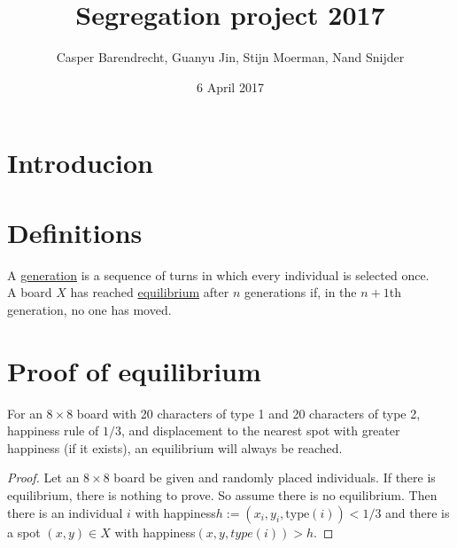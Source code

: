 \documentclass{article}
\title{Segregation project 2017}
\author{Casper Barendrecht, Guanyu Jin, Stijn Moerman, Nand Snijder}
\date{6 April 2017}
\begin{document}
\reversemarginpar 
\maketitle
\section{Introducion}

\section{Definitions}
A \underline{generation} is a sequence of turns in which every individual is selected once.\\
A board $X$ has reached \underline{equilibrium} after $n$ generations if, in the $n+1$th generation, no one has moved.

\section{Proof of equilibrium}

For an $8\times 8$ board with 20 characters of type 1 and 20 characters of type 2, happiness rule of $1/3$, and displacement to the nearest spot with greater happiness (if it exists), an equilibrium will always be reached.
\begin{proof}
Let an $8\times 8$ board be given and randomly placed individuals. If there is equilibrium, there is nothing to prove. So assume there is no equilibrium. Then there is an individual $i$ with happiness$h := (x_i,y_i,\text{type}(i)) < 1/3$ and there is a spot $(x,y)\in X$ with happiness$(x,y,type(i)) > h$.
\end{proof} 
\end{document}
